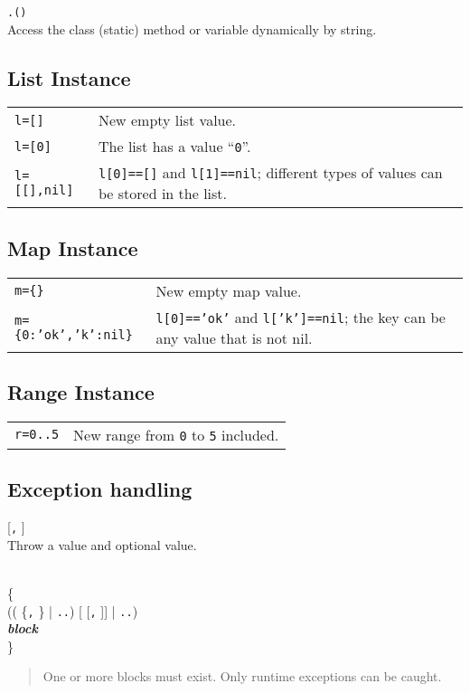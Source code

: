 \hangpar {}\texttt{.(}\texttt{)}\\
Access the class (static) method or variable dynamically by string.


\subsection*{List Instance}
\begin{tabular}{@{}lp{}}
\texttt{l=[]} & New empty list value. \\
\texttt{l=[0]} & The list has a value ``\texttt{0}''. \\
\texttt{l=[[],nil]} & \texttt{l[0]==[]} and \texttt{l[1]==nil}; different types of values can be stored in the list. \\
\end{tabular}

\subsection*{Map Instance}
\begin{tabular}{@{}lp{}}
    \texttt{m=\{\}} & New empty map value. \\
    \texttt{m=\{0:'ok','k':nil\}} & \texttt{l[0]=='ok'} and \texttt{l['k']==nil}; the key can be any value that is not nil.\\
\end{tabular}


\subsection*{Range Instance}
\begin{tabular}{@{}lp{}}
    \texttt{r=0..5} & New range from \texttt{0} to \texttt{5} included. \\
\end{tabular}

\subsection*{Exception handling}
\hangpar {}  [\texttt{,} ]\\
Throw a  value and optional  value.

\noindent {}\\
\hphantom{m} \{\\
 (( \{\texttt{,} \} | \texttt{..}) [  [\texttt{,} ]] | \texttt{..}) \textit{\\
\hphantom{m}\textbf{block}}\\
\} 
\begin{quote}
    One or more  blocks must exist. Only runtime exceptions can be caught.
\end{quote}

